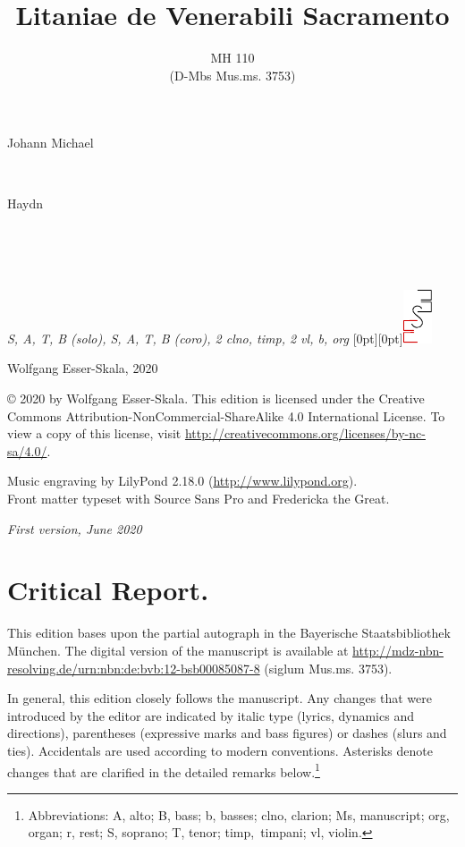 \documentclass[parskip=full]{scrreprt}
\makeatletter
\DeclareRobustCommand{\sbseries}{\fontseries{sb}\selectfont}
\newcommand\fancytitlehead{
	\headingfont%
	\fontsize{80}{80}\selectfont\textcolor{black!80}{\@ifundefined{@shortname}{\@lastname}{\@shortname}.}\\[15pt]%
	\fontsize{60}{60}\selectfont\@ifundefined{@shorttitle}{\@title}{\@shorttitle}.%
}
\def\firstname#1{\def\@firstname{#1}}
\def\lastname#1{\def\@lastname{#1}}
\def\shortname#1{\def\@shortname{#1}}
\def\shorttitle#1{\def\@shorttitle{#1}}
\def\instrumentation#1{\def\@instrumentation{#1}}
\def\maketitle{%
\begin{titlepage}%
	\Large%
	{\@titlehead}%
	\vfill%
	{\strut\@firstname}\\%
	{\sbseries\color{oldred}\strut\@lastname}\\%
	{\strut\@namesuffix}%
	\vfill%
	{\sbseries\@title}\\%
	{\@subtitle}\\[\baselineskip]%
	{\itshape\@instrumentation}%
	\vfill%
	{\itshape\@parts}\hspace*{\fill}\raisebox{0pt}[0pt][0pt]{\includegraphics{ees_logo}}%
\end{titlepage}%
}
\newif\ifprintreport\printreportfalse
\makeatother
\begin{document}
\titlehead{\fancytitlehead}
\firstname{Johann Michael}
\lastname{Haydn}
\shortname{M. Haydn}
\title{Litaniae de Venerabili Sacramento}
\shorttitle{Litaniae de V. S}
\subtitle{MH 110\\(D-Mbs Mus.ms. 3753)}
\instrumentation{S, A, T, B (solo), S, A, T, B (coro), 2 clno, timp, 2 vl, b, org}
\maketitle


\thispagestyle{empty}

\vspace*{\fill}

\hspace*{1em}Wolfgang Esser-Skala, 2020

© 2020 by Wolfgang Esser-Skala. This edition is licensed under the Creative Commons Attribution-NonCommercial-ShareAlike 4.0 International License. To view a copy of this license, visit \url{http://creativecommons.org/licenses/by-nc-sa/4.0/}. 

Music engraving by LilyPond 2.18.0 (\url{http://www.lilypond.org}).\\
Front matter typeset with Source Sans Pro and Fredericka the Great.

\textit{First version, June 2020}

\vspace*{2cm}

\ifprintreport
\chapter*{Critical Report.}

This edition bases upon the partial autograph in the Bayerische Staatsbibliothek München. The digital version of the manuscript is available at \url{http://mdz-nbn-resolving.de/urn:nbn:de:bvb:12-bsb00085087-8} (siglum Mus.ms. 3753).

In general, this edition closely follows the manuscript. Any changes that were introduced by the editor are indicated by italic type (lyrics, dynamics and directions), parentheses (expressive marks and bass figures) or dashes (slurs and ties). Accidentals are used according to modern conventions. Asterisks denote changes that are clarified in the detailed remarks below.\footnote{Abbreviations: A, alto; B, bass; b, basses; clno, clarion; Ms, manuscript; org, organ; r, rest; S, soprano; T, tenor; timp,~timpani; vl, violin.}
\end{document}
